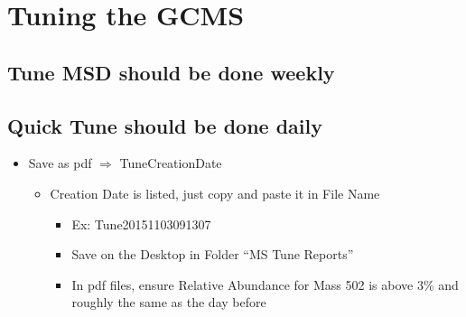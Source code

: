 \documentclass[letterpaper,11pt]{article}
\begin{document}
\section{Tuning the GCMS}
	\subsection{Tune MSD should be done weekly}
    \subsection{Quick Tune should be done daily}
    	\begin{itemize}
    	\item Save as pdf $\Longrightarrow$ TuneCreationDate
        	\begin{itemize}
        	\item Creation Date is listed, just copy and paste it in File Name
            	\begin{itemize}
            	\item Ex: Tune20151103091307
            \item Save on the Desktop in Folder ``MS Tune Reports''
            \item In pdf files, ensure Relative Abundance for Mass 502 is above 3\% and roughly the same as the day before
            	\end{itemize}
        	\end{itemize}
    	\end{itemize}
        
\end{document}
